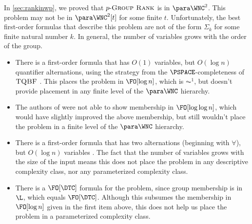 In \autoref{sec:rankinwp}, we proved that $p\textnormal{-}\textsc{Group Rank}$ is in $\para \WNC^2$.
This problem may not be in $\para \WNC^2[t]$ for some finite $t$.
Unfortunately, the best first-order formulas that describe this problem are not of the form $\Sigma_k$ for some finite natural number $k$.
In general, the number of variables grows with the order of the group.
\begin{itemize}
\item
  There is a first-order formula that has $O(1)$ variables, but $O(\log n)$ quantifier alternations, using the strategy from the $\PSPACE$-completeness of $\textsc{TQBF}$ \autocite[Lemma~2.3]{nt16}.
  This places the problem in $\FO[\log n]$, which is $\AC^1$, but doesn't provide placement in any finite level of the $\para \WNC$ hierarchy.
\item
  The authors of \autocite{bklm01} were not able to show membership in $\FO[\log \log n]$, which would have slightly improved the above membership, but still wouldn't place the problem in a finite level of the $\para \WNC$ hierarchy.
\item
  There is a first-order formula that has two alternations (beginning with $\forall$), but $O(\log n)$ variables \autocite[Lemma~3.5]{nt16}.
  The fact that the number of variables grows with the size of the input means this does not place the problem in any descriptive complexity class, nor any parameterized complexity class.
\item
  There is a $\FO[\DTC]$ formula for the problem, since group membership is in $\L$, which equals $\FO[\DTC]$.
  Although this subsumes the membership in $\FO[\log n]$ given in the first item above, this does not help us place the problem in a parameterized complexity class.
\end{itemize}
